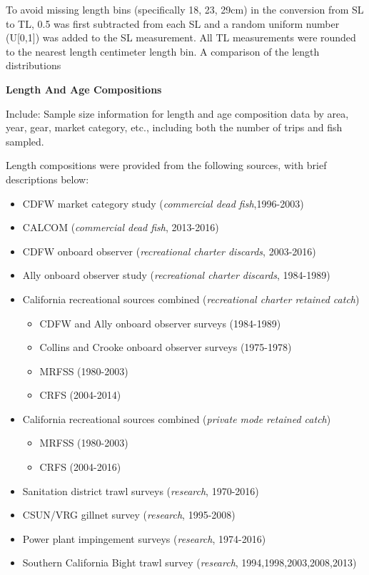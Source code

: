 \documentclass[12pt,]{article}
\begin{document}
To avoid missing length bins (specifically 18, 23, 29cm) in the
conversion from SL to TL, 0.5 was first subtracted from each SL and a
random uniform number (U{[}0,1{]}) was added to the SL measurement. All
TL measurements were rounded to the nearest length centimeter length
bin. A comparison of the length distributions

\textbf{Length And Age Compositions}

Include: Sample size information for length and age composition data by
area, year, gear, market category, etc., including both the number of
trips and fish sampled.

Length compositions were provided from the following sources, with brief
descriptions below:

\begin{itemize}[noitemsep,nolistsep,topsep=0pt]
  \item CDFW market category study (\emph{commercial dead fish},1996-2003)    
  \item CALCOM (\emph{commercial dead fish}, 2013-2016)    
  \item CDFW onboard observer (\emph{recreational charter discards}, 2003-2016)    
  \item Ally onboard observer study (\emph{recreational charter discards}, 1984-1989)  
  \item California recreational sources combined (\emph{recreational charter retained catch})     
    \begin{itemize}[noitemsep,nolistsep]
      \item CDFW and Ally onboard observer surveys (1984-1989)     
      \item Collins and Crooke onboard observer surveys (1975-1978)     
      \item MRFSS (1980-2003)     
      \item CRFS (2004-2014)
    \end{itemize}
 \item California recreational sources combined (\emph{private mode retained catch})      
    \begin{itemize}[noitemsep,nolistsep]   
      \item MRFSS (1980-2003)      
      \item CRFS (2004-2016)  
    \end{itemize}
 \item Sanitation district trawl surveys (\emph{research}, 1970-2016)      
 \item CSUN/VRG gillnet survey (\emph{research}, 1995-2008)        
 \item Power plant impingement surveys (\emph{research}, 1974-2016) 
 \item Southern California Bight trawl survey (\emph{research}, 1994,1998,2003,2008,2013) 
\end{itemize}
\end{document}

